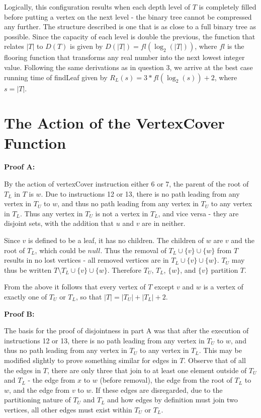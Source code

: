 \documentclass{article}
\begin{document}
Logically, this configuration results when each depth level of $T$ is completely
filled before putting a vertex on the next level - the binary tree cannot be
compressed any further. The structure described is one that is as close to a
full binary tree as possible. Since the capacity of each level is double the
previous, the function that relates $|T|$ to $D(T)$ is given by
$D(|T|)=fl(\log_2(|T|))$, where $fl$ is the flooring function that transforms
any real number into the next lowest integer value.
Following the same derivations as in question 3, we arrive at the best case
running time of findLeaf given by $R_L(s)=3*fl(\log_2(s))+2$, where $s=|T|$.

\section{The Action of the VertexCover Function}

\textbf{Proof A:}

By the action of vertexCover instruction either 6 or 7, the parent of the root
of $T_L$ in $T$ is $w$. Due to instructions 12 or 13, there is no path leading
from any vertex in $T_U$ to $w$, and thus no path leading from any vertex in
$T_U$ to any vertex in $T_L$. Thus any vertex in $T_U$ is not a vertex in
$T_L$, and vice versa - they are disjoint sets, with the addition that $u$ and
$v$ are in neither.

Since $v$ is defined to be a leaf, it has no children. The children of $w$ are
$v$ and the root of $T_L$, which could be $null$. Thus the removal of $T_L \cup
\{v\} \cup \{w\}$ from $T$ results in no lost vertices - all removed vertices
are in $T_L \cup \{v\} \cup \{w\}$. $T_U$ may thus be written $T \setminus T_L
\cup \{v\} \cup \{w\}$. Therefore $T_U$, $T_L$, $\{w\}$, and $\{v\}$ partition
$T$.

From the above it follows that every vertex of $T$ except $v$ and $w$ is a
vertex of exactly one of $T_U$ or $T_L$, so that $|T| = |T_U| + |T_L| + 2$.

\textbf{Proof B:}

The basis for the proof of disjointness in part A was that after the execution
of instructions 12 or 13, there is no path leading from any vertex in $T_U$ to
$w$, and thus no path leading from any vertex in $T_U$ to any vertex in $T_L$.
This may be modified slightly to prove something similar for edges in $T$.
Observe that of all the edges in $T$, there are only three that join to at
least one element outside of $T_U$ and $T_L$ - the edge from $x$ to $w$ (before
removal), the edge from the root of $T_L$ to $w$, and the edge from $v$ to $w$.
If these edges are disregarded, due to the partitioning nature of $T_U$ and
$T_L$ and how edges by definition must join two vertices, all other edges must
exist within $T_U$ or $T_L$.
\end{document}
